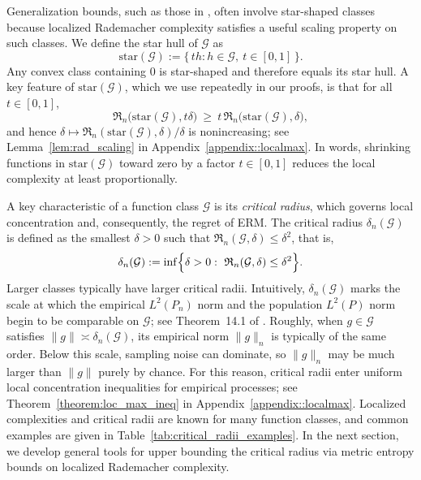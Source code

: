\documentclass[11pt]{article}
\theoremstyle{plain}
\theoremstyle{definition} %
\begin{document}
Generalization bounds, such as those in \cite{wainwright2019high}, often involve star-shaped classes because localized Rademacher complexity satisfies a useful scaling property on such classes. We define the star hull of \(\mathcal{G}\) as
\[
\mathrm{star}(\mathcal{G}) := \{\, th : h \in \mathcal{G},\ t \in [0,1] \,\}.
\]
Any convex class containing \(0\) is star-shaped and therefore equals its star hull. A key feature of \(\mathrm{star}(\mathcal{G})\), which we use repeatedly in our proofs, is that for all \(t \in [0,1]\),
\[
\mathfrak{R}_n\bigl(\mathrm{star}(\mathcal{G}), t\delta\bigr)
\ \ge\
t\,\mathfrak{R}_n\bigl(\mathrm{star}(\mathcal{G}), \delta\bigr),
\]
and hence \(\delta \mapsto \mathfrak{R}_n(\mathrm{star}(\mathcal{G}),\delta)/\delta\) is nonincreasing; see Lemma~\ref{lem:rad_scaling} in Appendix~\ref{appendix::localmax}. In words, shrinking functions in \(\mathrm{star}(\mathcal{G})\) toward zero by a factor \(t \in [0,1]\) reduces the local complexity at least proportionally.


A key characteristic of a function class \(\mathcal{G}\) is its \emph{critical radius}, which governs local concentration and, consequently, the regret of ERM. The critical radius \(\delta_n(\mathcal{G})\) is defined as the smallest \(\delta>0\) such that \(\mathfrak{R}_n(\mathcal{G},\delta)\le \delta^2\), that is,
\[
\delta_n(\mathcal{G})
:= \inf\Bigl\{\delta>0:\ \mathfrak{R}_n(\mathcal{G},\delta)\le \delta^2\Bigr\}.
\]
Larger classes typically have larger critical radii. Intuitively, \(\delta_n(\mathcal G)\) marks the scale at which the empirical \(L^2(P_n)\) norm and the population \(L^2(P)\) norm begin to be comparable on \(\mathcal G\); see Theorem~14.1 of \citealp{wainwright2019high}. Roughly, when \(g\in\mathcal{G}\) satisfies \(\|g\|\asymp \delta_n(\mathcal{G})\), its empirical norm \(\|g\|_n\) is typically of the same order. Below this scale, sampling noise can dominate, so \(\|g\|_n\) may be much larger than \(\|g\|\) purely by chance. For this reason, critical radii enter uniform local concentration inequalities for empirical processes; see Theorem~\ref{theorem:loc_max_ineq} in Appendix~\ref{appendix::localmax}. Localized complexities and critical radii are known for many function classes, and common examples are given in Table~\ref{tab:critical_radii_examples}. In the next section, we develop general tools for upper bounding the critical radius via metric entropy bounds on localized Rademacher complexity.
\end{document}
